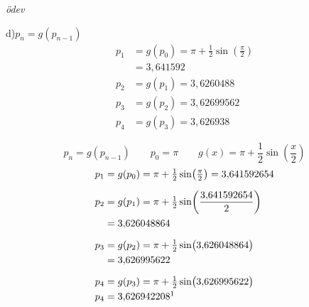 \documentclass[11pt,a4paper]{article}
\begin{document}
\noindent\textit{ödev}

d)\quad $p_n=g(p_{n-1})$
\begin{align*}
  p_1&=g(p_0)=\pi+\tfrac12\sin\!\left(\tfrac{\pi}{2}\right)\\
     &=3{,}641592\\[2mm]
  p_2&=g(p_1)=3{,}6260488\\[2mm]
  p_3&=g(p_2)=3{,}62699562\\
  p_4&=g(p_3)=3{,}626938
\end{align*}

\begin{cozum}
\[
  p_n=g(p_{n-1}) \qquad p_0=\pi \qquad g(x)=\pi+\frac12\sin\!\left(\frac{x}{2}\right)
\]
\begin{align*}
  p_1&=g(p_0)=\pi+\tfrac12\sin\!\left(\tfrac{\pi}{2}\right)=3{,}641592654\\[2mm]
  p_2&=g(p_1)=\pi+\tfrac12\sin\!\left(\frac{3{,}641592654}{2}\right)\\
     &=3{,}626048864\\[2mm]
  p_3&=g(p_2)=\pi+\tfrac12\sin\bigl(3{,}626048864\bigr)\\
     &=3{,}626995622\\[2mm]
  p_4&=g(p_3)=\pi+\tfrac12\sin\bigl(3{,}626995622\bigr)\\
  p_4&=3{,}626942208\footnotemark
\end{align*}
\end{cozum}
\end{document}
